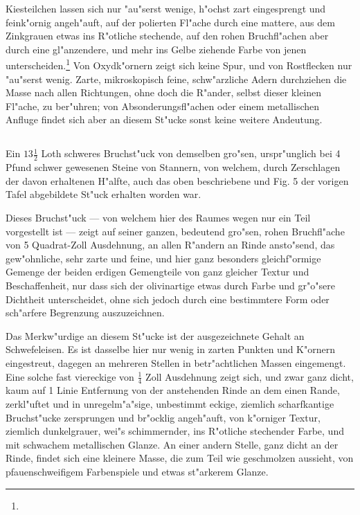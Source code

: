 \documentclass[a4paper, 11pt, oneside, german]{article}
\begin{document}
Kiesteilchen lassen sich nur "au"serst wenige, h"ochst zart eingesprengt und feink"ornig angeh"auft, auf der polierten Fl"ache durch eine mattere, aus dem Zinkgrauen etwas ins R"otliche stechende, auf den rohen Bruchfl"achen aber durch eine gl"anzendere, und mehr ins Gelbe ziehende Farbe von jenen unterscheiden.\footnote{} Von Oxydk"ornern zeigt sich keine Spur, und von Rostflecken nur "au"serst wenig. Zarte, mikroskopisch feine, schw"arzliche Adern durchziehen die Masse nach allen Richtungen, ohne doch die R"ander, selbst dieser kleinen Fl"ache, zu ber"uhren; von Absonderungsfl"achen oder einem metallischen Anfluge findet sich aber an diesem St"ucke sonst keine weitere Andeutung.

\subsection{}
\paragraph{}
Ein $13\frac{1}{2}$ Loth schweres Bruchst"uck von demselben gro"sen, urspr"unglich bei 4 Pfund schwer gewesenen Steine von Stannern, von welchem, durch Zerschlagen der davon erhaltenen H"alfte, auch das oben beschriebene und Fig. 5 der vorigen Tafel abgebildete St"uck erhalten worden war.

Dieses Bruchst"uck --- von welchem hier des Raumes wegen nur ein Teil vorgestellt ist --- zeigt auf seiner ganzen, bedeutend gro"sen, rohen Bruchfl"ache von 5 Quadrat-Zoll Ausdehnung, an allen R"andern an Rinde ansto"send, das gew"ohnliche, sehr zarte und feine, und hier ganz besonders gleichf"ormige Gemenge der beiden erdigen Gemengteile von ganz gleicher Textur und Beschaffenheit, nur dass sich der olivinartige etwas durch Farbe und gr"o"sere Dichtheit unterscheidet, ohne sich jedoch durch eine bestimmtere Form oder sch"arfere Begrenzung auszuzeichnen.

Das Merkw"urdige an diesem St"ucke ist der ausgezeichnete Gehalt an Schwefeleisen. Es ist dasselbe hier nur wenig in zarten Punkten und K"ornern eingestreut, dagegen an mehreren Stellen in betr"achtlichen Massen eingemengt. Eine solche fast viereckige von $\frac{1}{4}$ Zoll Ausdehnung zeigt sich, und zwar ganz dicht, kaum auf 1 Linie Entfernung von der anstehenden Rinde an dem einen Rande, zerkl"uftet und in unregelm"a"sige, unbestimmt eckige, ziemlich scharfkantige Bruchst"ucke zersprungen und br"ocklig angeh"auft, von k"orniger Textur, ziemlich dunkelgrauer, wei"s schimmernder, ins R"otliche stechender Farbe, und mit schwachem metallischen Glanze. An einer andern Stelle, ganz dicht an der Rinde, findet sich eine kleinere Masse, die zum Teil wie geschmolzen aussieht, von pfauenschweifigem Farbenspiele und etwas st"arkerem Glanze.
\clearpage
\end{document}
